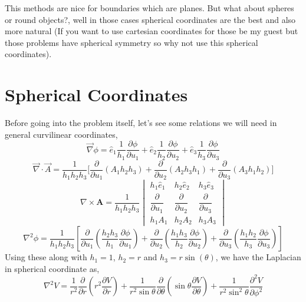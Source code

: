 \documentclass{article}
\begin{document}
This methods are nice for boundaries which are planes. But what about spheres or round objects?, well in those cases spherical coordinates are the best and also more natural (If you want to use cartesian coordinates for those be my guest but those problems have spherical symmetry so why not use this spherical coordinates).
\section{Spherical Coordinates}
Before going into the problem itself, let's see some relations we will need in general curvilinear coordinates,
\begin{equation}
    \vec{\nabla}\phi = \hat{e}_1\frac{1}{h_1}\frac{\partial \phi}{\partial u_1} + \hat{e}_2\frac{1}{h_2}\frac{\partial \phi}{\partial u_2} + \hat{e}_3\frac{1}{h_3}\frac{\partial \phi}{\partial u_3}
    \label{curvi_lin_grad}
\end{equation}
\begin{equation}
    \vec{\nabla}\cdot \vec{A} = \frac{1}{h_1 h_2 h_3}\Bigg[\frac{\partial}{\partial u_1}(A_1 h_2 h_3 ) + \frac{\partial}{\partial u_2}(A_2 h_3 h_1 ) + \frac{\partial}{\partial u_3}(A_3 h_1 h_2 )\Bigg]
    \label{curvi_lin_div}
\end{equation}
\begin{equation}
    \nabla \times \mathbf{A} = 
    \frac{1}{h_1 h_2 h_3}
    \begin{vmatrix}
    h_1 \hat{e}_1 & h_2 \hat{e}_2 & h_3 \hat{e}_3 \\
    \dfrac{\partial}{\partial u_1} & \dfrac{\partial}{\partial u_2} & \dfrac{\partial}{\partial u_3} \\
    h_1 A_1 & h_2 A_2 & h_3 A_3
    \end{vmatrix}
    \label{curvi_lin_curl}
\end{equation}
\begin{equation}
    \nabla^2 \phi =
    \frac{1}{h_1 h_2 h_3} 
    \left[
    \frac{\partial}{\partial u_1}
    \left( \frac{h_2 h_3}{h_1} \frac{\partial \phi}{\partial u_1} \right)
    +
    \frac{\partial}{\partial u_2}
    \left( \frac{h_1 h_3}{h_2} \frac{\partial \phi}{\partial u_2} \right)
    +
    \frac{\partial}{\partial u_3}
    \left( \frac{h_1 h_2}{h_3} \frac{\partial \phi}{\partial u_3} \right)
    \right]
    \label{curvi_lin_lapl}
\end{equation}
Using these along with $h_1=1$, $h_2 = r$ and $h_3 = r \sin(\theta)$, we have the Laplacian in spherical coordinate as,
\begin{equation}
    \nabla^2 V =
\frac{1}{r^2} \frac{\partial}{\partial r}
\left( r^2 \frac{\partial V}{\partial r} \right)
+ \frac{1}{r^2 \sin \theta} \frac{\partial}{\partial \theta}
\left( \sin \theta \frac{\partial V}{\partial \theta} \right)
+ \frac{1}{r^2 \sin^2 \theta} \frac{\partial^2 V}{\partial \phi^2}
\label{spherical_lap}
\end{equation}
\end{document}
